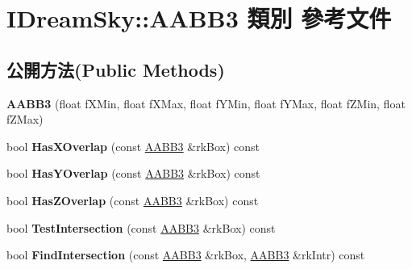 \hypertarget{class_i_dream_sky_1_1_a_a_b_b3}{}\section{I\+Dream\+Sky\+:\+:A\+A\+B\+B3 類別 參考文件}
\label{class_i_dream_sky_1_1_a_a_b_b3}
\subsection*{公開方法(Public Methods)}
\begin{DoxyCompactItemize}
\item 
{\bfseries A\+A\+B\+B3} (float f\+X\+Min, float f\+X\+Max, float f\+Y\+Min, float f\+Y\+Max, float f\+Z\+Min, float f\+Z\+Max)\hypertarget{class_i_dream_sky_1_1_a_a_b_b3_acd9ad9724d416ff7d29b0b9485d1975d}{}\label{class_i_dream_sky_1_1_a_a_b_b3_acd9ad9724d416ff7d29b0b9485d1975d}

\item 
bool {\bfseries Has\+X\+Overlap} (const \hyperlink{class_i_dream_sky_1_1_a_a_b_b3}{A\+A\+B\+B3} \&rk\+Box) const \hypertarget{class_i_dream_sky_1_1_a_a_b_b3_a7020a1d74b38fc9cdae2cc38a1612a3b}{}\label{class_i_dream_sky_1_1_a_a_b_b3_a7020a1d74b38fc9cdae2cc38a1612a3b}

\item 
bool {\bfseries Has\+Y\+Overlap} (const \hyperlink{class_i_dream_sky_1_1_a_a_b_b3}{A\+A\+B\+B3} \&rk\+Box) const \hypertarget{class_i_dream_sky_1_1_a_a_b_b3_afdc299452ba1d6e634a68fc0f4e24610}{}\label{class_i_dream_sky_1_1_a_a_b_b3_afdc299452ba1d6e634a68fc0f4e24610}

\item 
bool {\bfseries Has\+Z\+Overlap} (const \hyperlink{class_i_dream_sky_1_1_a_a_b_b3}{A\+A\+B\+B3} \&rk\+Box) const \hypertarget{class_i_dream_sky_1_1_a_a_b_b3_a3f7cd5ab04bc413a88e099208437b31c}{}\label{class_i_dream_sky_1_1_a_a_b_b3_a3f7cd5ab04bc413a88e099208437b31c}

\item 
bool {\bfseries Test\+Intersection} (const \hyperlink{class_i_dream_sky_1_1_a_a_b_b3}{A\+A\+B\+B3} \&rk\+Box) const \hypertarget{class_i_dream_sky_1_1_a_a_b_b3_af7fb33b1675667b506809bfb6b7f50eb}{}\label{class_i_dream_sky_1_1_a_a_b_b3_af7fb33b1675667b506809bfb6b7f50eb}

\item 
bool {\bfseries Find\+Intersection} (const \hyperlink{class_i_dream_sky_1_1_a_a_b_b3}{A\+A\+B\+B3} \&rk\+Box, \hyperlink{class_i_dream_sky_1_1_a_a_b_b3}{A\+A\+B\+B3} \&rk\+Intr) const \hypertarget{class_i_dream_sky_1_1_a_a_b_b3_ae83c7947f08558af7c273b00002331aa}{}\label{class_i_dream_sky_1_1_a_a_b_b3_ae83c7947f08558af7c273b00002331aa}

\end{DoxyCompactItemize}
